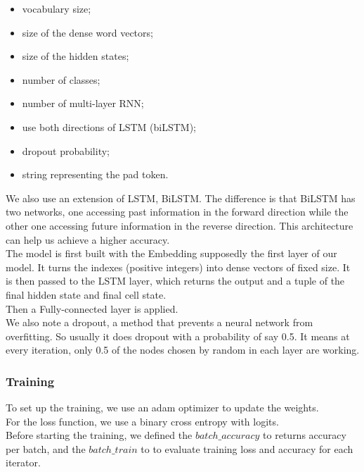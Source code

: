 \documentclass{article}
\begin{document}
\begin{itemize}
    \item vocabulary size;
    \item size of the dense word vectors;
    \item size of the hidden states;
    \item number of classes;
    \item number of multi-layer RNN;
    \item use both directions of LSTM (biLSTM);
    \item dropout probability;
    \item string representing the pad token.
\end{itemize}

We also use an extension of LSTM, BiLSTM. The difference is that BiLSTM has two networks, one accessing
past information in the forward direction while the other one accessing future information in the reverse direction. This architecture can help us achieve a higher accuracy.\\

The model is first built with the Embedding supposedly the first layer of our model. It turns the indexes (positive integers) into dense vectors of fixed size. It is then passed to the LSTM layer, which returns the output and a tuple of the final hidden state and final cell state.\\

Then a Fully-connected layer is applied.\\

We also note a dropout, a method that prevents a neural network from overfitting. So usually it does dropout with a probability of say 0.5. It means at every iteration, only 0.5 of the nodes chosen by random in each layer are working.

\subsubsection{Training}

To set up the training, we use an adam optimizer to update the weights.\\

For the loss function, we use a binary cross entropy with logits.\\

Before starting the training, we defined the $batch\_accuracy$ to returns accuracy per batch, and the $batch\_train$ to to evaluate training loss and accuracy for each iterator.\\
\end{document}
